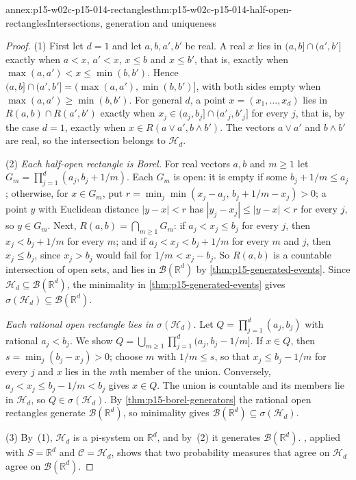 \begin{annexitem}{annex:p15-w02c-p15-014-rectangles}{thm:p15-w02c-p15-014-half-open-rectangles}{Intersections, generation and uniqueness}
\begin{proof}
(1) First let \(d=1\) and let \(a,b,a',b'\) be real. A real \(x\) lies
in \((a,b]\cap(a',b']\) exactly when \(a<x\), \(a'<x\), \(x\leq b\)
and \(x\leq b'\), that is, exactly when
\(\max(a,a')<x\leq\min(b,b')\). Hence
\((a,b]\cap(a',b']=(\max(a,a'),\min(b,b')]\), with both sides empty
when \(\max(a,a')\geq\min(b,b')\). For general \(d\), a point
\(x=(x_1,\ldots,x_d)\) lies in \(R(a,b)\cap R(a',b')\) exactly when
\(x_j\in(a_j,b_j]\cap(a'_j,b'_j]\) for every \(j\), that is, by the
case \(d=1\), exactly when \(x\in R(a\vee a',b\wedge b')\). The vectors
\(a\vee a'\) and \(b\wedge b'\) are real, so the intersection belongs
to \(\mathcal H_d\).

(2) \emph{Each half-open rectangle is Borel.} For real vectors \(a,b\)
and \(m\geq1\) let \(G_m=\prod_{j=1}^d(a_j,b_j+1/m)\). Each \(G_m\) is
open: it is empty if some \(b_j+1/m\leq a_j\); otherwise, for
\(x\in G_m\), put
\(r=\min_j\min(x_j-a_j,\,b_j+1/m-x_j)>0\); a point \(y\) with
Euclidean distance \(|y-x|<r\) has \(|y_j-x_j|\leq|y-x|<r\) for every
\(j\), so \(y\in G_m\). Next, \(R(a,b)=\bigcap_{m\geq1}G_m\): if
\(a_j<x_j\leq b_j\) for every \(j\), then \(x_j<b_j+1/m\) for every
\(m\); and if \(a_j<x_j<b_j+1/m\) for every \(m\) and \(j\), then
\(x_j\leq b_j\), since \(x_j>b_j\) would fail for \(1/m<x_j-b_j\).
So \(R(a,b)\) is a countable intersection of open sets, and lies in
\(\mathcal B(\mathbb R^d)\) by \cref{thm:p15-generated-events}. Since
\(\mathcal H_d\subseteq\mathcal B(\mathbb R^d)\), the minimality in
\cref{thm:p15-generated-events} gives
\(\sigma(\mathcal H_d)\subseteq\mathcal B(\mathbb R^d)\).

\emph{Each rational open rectangle lies in \(\sigma(\mathcal H_d)\).}
Let \(Q=\prod_{j=1}^d(a_j,b_j)\) with rational \(a_j<b_j\). We show
\(Q=\bigcup_{m\geq1}\prod_{j=1}^d(a_j,b_j-1/m]\). If \(x\in Q\), then
\(s=\min_j(b_j-x_j)>0\); choose \(m\) with \(1/m\leq s\), so that
\(x_j\leq b_j-1/m\) for every \(j\) and \(x\) lies in the \(m\)th
member of the union. Conversely, \(a_j<x_j\leq b_j-1/m<b_j\) gives
\(x\in Q\). The union is countable and its members lie in
\(\mathcal H_d\), so \(Q\in\sigma(\mathcal H_d)\). By
\cref{thm:p15-borel-generators} the rational open rectangles generate
\(\mathcal B(\mathbb R^d)\), so minimality gives
\(\mathcal B(\mathbb R^d)\subseteq\sigma(\mathcal H_d)\).

(3) By~(1), \(\mathcal H_d\) is a pi-system on \(\mathbb R^d\), and
by~(2) it generates \(\mathcal B(\mathbb R^d)\).
, applied with \(S=\mathbb R^d\) and
\(\mathcal C=\mathcal H_d\), shows that two probability measures that
agree on \(\mathcal H_d\) agree on \(\mathcal B(\mathbb R^d)\).
\end{proof}
\end{annexitem}

